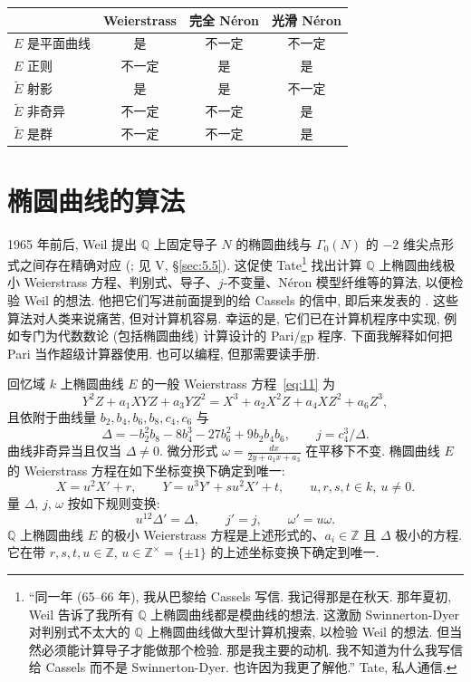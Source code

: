\begin{center}
\renewcommand{\arraystretch}{1.3}
\begin{tabular}{lccc}
\hline
& Weierstrass & 完全 N\'eron & 光滑 N\'eron\\
\hline
$E$ 是平面曲线 & 是 & 不一定 & 不一定\\
$E$ 正则 & 不一定 & 是 & 是\\
$\tilde{E}$ 射影 & 是 & 是 & 不一定\\
$\tilde{E}$ 非奇异 & 不一定 & 不一定 & 是\\
$\tilde{E}$ 是群 & 不一定 & 不一定 & 是\\
\hline
\end{tabular}
\end{center}

\section{椭圆曲线的算法}\label{sec:2.8}

1965 年前后, Weil 提出 $\mathbb{Q}$ 上固定导子 $N$ 的椭圆曲线与 $\Gamma_0(N)$ 的 $-2$ 维尖点形式之间存在精确对应 (\cite{weil1967}; 见 V, \S\ref{sec:5.5}). 这促使 Tate\footnote{``同一年 (65--66 年), 我从巴黎给 Cassels 写信. 我记得那是在秋天. 那年夏初, Weil 告诉了我所有 $\mathbb{Q}$ 上椭圆曲线都是模曲线的想法. 这激励 Swinnerton-Dyer 对判别式不太大的 $\mathbb{Q}$ 上椭圆曲线做大型计算机搜索, 以检验 Weil 的想法. 但当然必须能计算导子才能做那个检验. 那是我主要的动机. 我不知道为什么我写信给 Cassels 而不是 Swinnerton-Dyer. 也许因为我更了解他.'' Tate, 私人通信.} 找出计算 $\mathbb{Q}$ 上椭圆曲线极小 Weierstrass 方程、判别式、导子、$j$-不变量、N\'eron 模型纤维等的算法, 以便检验 Weil 的想法. 他把它们写进前面提到的给 Cassels 的信中, 即后来发表的 \cite{tate1975}. 这些算法对人类来说痛苦, 但对计算机容易. 幸运的是, 它们已在计算机程序中实现, 例如专门为代数数论 (包括椭圆曲线) 计算设计的 Pari/gp 程序. 下面我解释如何把 Pari 当作超级计算器使用. 也可以编程, 但那需要读手册.

回忆域 $k$ 上椭圆曲线 $E$ 的一般 Weierstrass 方程~\eqref{eq:11} 为
\[
Y^2Z + a_1XYZ + a_3YZ^2 = X^3 + a_2X^2Z + a_4XZ^2 + a_6Z^3,
\]
且依附于曲线量 $b_2, b_4, b_6, b_8, c_4, c_6$ 与
\[
\Delta = -b_2^2b_8 - 8b_4^3 - 27b_6^2 + 9b_2b_4b_6, \qquad j = c_4^3/\Delta.
\]
曲线非奇异当且仅当 $\Delta\neq 0$. 微分形式 $\omega = \frac{dx}{2y + a_1x + a_3}$ 在平移下不变. 椭圆曲线 $E$ 的 Weierstrass 方程在如下坐标变换下确定到唯一:
\[
X = u^2X' + r, \qquad Y = u^3Y' + su^2X' + t, \qquad u,r,s,t\in k, \ u\neq 0.
\]
量 $\Delta$, $j$, $\omega$ 按如下规则变换:
\[
u^{12}\Delta' = \Delta, \qquad j' = j, \qquad \omega' = u\omega.
\]
$\mathbb{Q}$ 上椭圆曲线 $E$ 的极小 Weierstrass 方程是上述形式的、$a_i\in\mathbb{Z}$ 且 $\Delta$ 极小的方程. 它在带 $r,s,t,u\in\mathbb{Z}$, $u\in\mathbb{Z}^{\times} = \{\pm 1\}$ 的上述坐标变换下确定到唯一.

